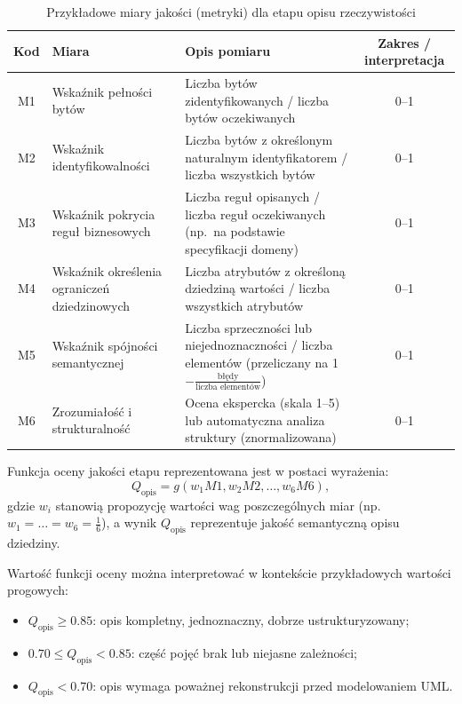 \begin{table}[!ht]
  \centering
  \caption{Przykładowe miary jakości (metryki) dla etapu opisu rzeczywistości}
  \label{tab:opis-metryki}
  \scriptsize
  \begin{tabularx}{\textwidth}{cLp{5cm}C}
    \toprule
    \textbf{Kod} & \textbf{Miara} & \textbf{Opis pomiaru} & \textbf{Zakres / interpretacja} \\
    \midrule
    M1 &
    Wskaźnik pełności bytów &
    Liczba bytów zidentyfikowanych / liczba bytów oczekiwanych &
    0--1 \\
    M2 &
    Wskaźnik identyfikowalności &
    Liczba bytów z określonym naturalnym identyfikatorem / liczba wszystkich bytów &
    0--1 \\
    M3 &
    Wskaźnik pokrycia reguł biznesowych &
    Liczba reguł opisanych / liczba reguł oczekiwanych (np.\ na podstawie specyfikacji domeny) &
    0--1 \\
    M4 &
    Wskaźnik określenia ograniczeń dziedzinowych &
    Liczba atrybutów z określoną dziedziną wartości / liczba wszystkich atrybutów &
    0--1 \\
    M5 &
    Wskaźnik spójności semantycznej &
    Liczba sprzeczności lub niejednoznaczności / liczba elementów (przeliczany na 1$-\frac{\text{błędy}}{\text{liczba elementów}}$) &
    0--1 \\
    M6 &
    Zrozumiałość i strukturalność &
    Ocena ekspercka (skala 1--5) lub automatyczna analiza struktury (znormalizowana) &
    0--1 \\
    \bottomrule
  \end{tabularx}
\end{table}


Funkcja oceny jakości etapu reprezentowana jest w postaci wyrażenia:
\begin{equation}
  Q_{\mathrm{opis}} = g(w_1 M1, w_2 M2, \dots, w_6 M6),
\end{equation}
gdzie $w_i$ stanowią propozycję wartości wag poszczególnych miar (np.\ $w_1 = \dots = w_6 = \frac{1}{6}$), a wynik $Q_{\mathrm{opis}}$ reprezentuje jakość semantyczną opisu dziedziny.

Wartość funkcji oceny można interpretować w kontekście przykładowych wartości progowych:
\begin{itemize}
  \item $Q_{\mathrm{opis}} \ge 0.85$: opis kompletny, jednoznaczny, dobrze ustrukturyzowany;
  \item $0.70 \le Q_{\mathrm{opis}} < 0.85$: część pojęć brak lub niejasne zależności;
  \item $Q_{\mathrm{opis}} < 0.70$: opis wymaga poważnej rekonstrukcji przed modelowaniem UML.
\end{itemize}

